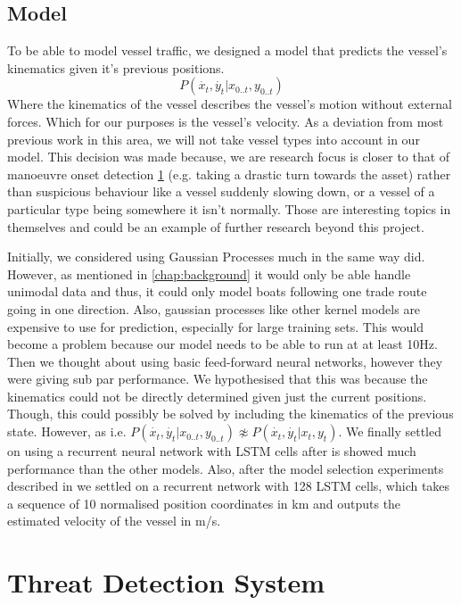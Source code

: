 \documentclass[bsc,frontabs,twoside,singlespacing,parskip,deptreport]{infthesis}     %
\begin{document}
\section{Model}

To be able to model vessel traffic, we designed a model that predicts the vessel's kinematics given it's previous positions.
$$P(\dot{x_t}, \dot{y_t}| x_{0..t}, y_{0..t})$$
Where the kinematics of the vessel describes the vessel's motion without external forces. Which for our purposes is the vessel's velocity. As a deviation from most previous work in this area, we will not take vessel types into account in our model. This decision was made because, we are research focus is closer to that of manoeuvre onset detection \ref{} (e.g. taking a drastic turn towards the asset) rather than suspicious behaviour like a vessel suddenly slowing down, or a vessel of a particular type being somewhere it isn't normally. Those are interesting topics in themselves and could be an example of further research beyond this project.

Initially, we considered using Gaussian Processes much in the same way \citep{kowalska2012maritime} did. However, as mentioned in \ref{chap:background} it would only be able handle unimodal data and thus, it could only model boats following one trade route going in one direction. Also, gaussian processes like other kernel models are expensive to use for prediction, especially for large training sets. This would become a problem because our model needs to be able to run at at least 10Hz. Then we thought about using basic feed-forward neural networks, however they were giving sub par performance. We hypothesised that this was because the kinematics could not be directly determined given just the current positions. Though, this could possibly be solved by including the kinematics of the previous state. However, as i.e. $P(\dot{x_t}, \dot{y_t}| x_{0..t}, y_{0..t}) \not\approx P(\dot{x_t}, \dot{y_t}| x_{t}, y_{t})$. We finally settled on using a recurrent neural network with LSTM cells after is showed much performance than the other models. Also, after the model selection experiments described in  we settled on a recurrent network with 128 LSTM cells, which takes a sequence of 10 normalised position coordinates in km and outputs the estimated velocity of the vessel in m/s.

\chapter{Threat Detection System}
\label{chap:detection}
\end{document}
